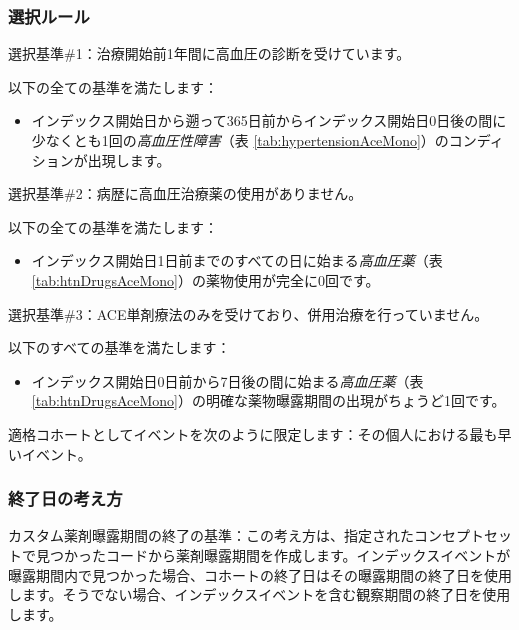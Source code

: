 \documentclass[
  11pt]{book}
\providecommand{\tightlist}{%
  \setlength{\itemsep}{0pt}\setlength{\parskip}{0pt}}
\theoremstyle{definition}
\theoremstyle{definition}
\theoremstyle{definition}
\theoremstyle{definition}
\theoremstyle{remark}
\begin{document}
\subsubsection*{選択ルール}\label{ux9078ux629eux30ebux30fcux30eb}

選択基準\#1：治療開始前1年間に高血圧の診断を受けています。

以下の全ての基準を満たします：

\begin{itemize}
\tightlist
\item
  インデックス開始日から遡って365日前からインデックス開始日0日後の間に少なくとも1回の\emph{高血圧性障害}（表 \ref{tab:hypertensionAceMono}）のコンディションが出現します。
\end{itemize}

選択基準\#2：病歴に高血圧治療薬の使用がありません。

以下の全ての基準を満たします：

\begin{itemize}
\tightlist
\item
  インデックス開始日1日前までのすべての日に始まる\emph{高血圧薬}（表 \ref{tab:htnDrugsAceMono}）の薬物使用が完全に0回です。
\end{itemize}

選択基準\#3：ACE単剤療法のみを受けており、併用治療を行っていません。

以下のすべての基準を満たします：

\begin{itemize}
\tightlist
\item
  インデックス開始日0日前から7日後の間に始まる\emph{高血圧薬}（表 \ref{tab:htnDrugsAceMono}）の明確な薬物曝露期間の出現がちょうど1回です。
\end{itemize}

適格コホートとしてイベントを次のように限定します：その個人における最も早いイベント。

\subsubsection*{終了日の考え方}\label{ux7d42ux4e86ux65e5ux306eux8003ux3048ux65b9-1}

カスタム薬剤曝露期間の終了の基準：この考え方は、指定されたコンセプトセットで見つかったコードから薬剤曝露期間を作成します。インデックスイベントが曝露期間内で見つかった場合、コホートの終了日はその曝露期間の終了日を使用します。そうでない場合、インデックスイベントを含む観察期間の終了日を使用します。
\end{document}
